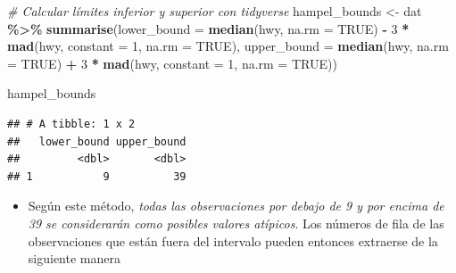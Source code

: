 \documentclass[
]{book}
\newenvironment{Shaded}{\begin{snugshade}}{\end{snugshade}}
\newcommand{\AttributeTok}[1]{\textcolor[rgb]{0.13,0.29,0.53}{#1}}
\newcommand{\CommentTok}[1]{\textcolor[rgb]{0.56,0.35,0.01}{\textit{#1}}}
\newcommand{\ConstantTok}[1]{\textcolor[rgb]{0.56,0.35,0.01}{#1}}
\newcommand{\DecValTok}[1]{\textcolor[rgb]{0.00,0.00,0.81}{#1}}
\newcommand{\FunctionTok}[1]{\textcolor[rgb]{0.13,0.29,0.53}{\textbf{#1}}}
\newcommand{\NormalTok}[1]{#1}
\newcommand{\OtherTok}[1]{\textcolor[rgb]{0.56,0.35,0.01}{#1}}
\newcommand{\SpecialCharTok}[1]{\textcolor[rgb]{0.81,0.36,0.00}{\textbf{#1}}}
\providecommand{\tightlist}{%
  \setlength{\itemsep}{0pt}\setlength{\parskip}{0pt}}
\begin{document}
\begin{Shaded}
\begin{Highlighting}[]
\CommentTok{\# Calcular límites inferior y superior con tidyverse}
\NormalTok{hampel\_bounds }\OtherTok{\textless{}{-}}\NormalTok{ dat }\SpecialCharTok{\%\textgreater{}\%}
  \FunctionTok{summarise}\NormalTok{(}\AttributeTok{lower\_bound =} \FunctionTok{median}\NormalTok{(hwy, }\AttributeTok{na.rm =} \ConstantTok{TRUE}\NormalTok{) }\SpecialCharTok{{-}} \DecValTok{3} \SpecialCharTok{*} \FunctionTok{mad}\NormalTok{(hwy, }\AttributeTok{constant =} \DecValTok{1}\NormalTok{, }\AttributeTok{na.rm =} \ConstantTok{TRUE}\NormalTok{),}
    \AttributeTok{upper\_bound =} \FunctionTok{median}\NormalTok{(hwy, }\AttributeTok{na.rm =} \ConstantTok{TRUE}\NormalTok{) }\SpecialCharTok{+} \DecValTok{3} \SpecialCharTok{*} \FunctionTok{mad}\NormalTok{(hwy, }\AttributeTok{constant =} \DecValTok{1}\NormalTok{, }\AttributeTok{na.rm =} \ConstantTok{TRUE}\NormalTok{))}

\NormalTok{hampel\_bounds}
\end{Highlighting}
\end{Shaded}

\begin{verbatim}
## # A tibble: 1 x 2
##   lower_bound upper_bound
##         <dbl>       <dbl>
## 1           9          39
\end{verbatim}

\begin{itemize}
\tightlist
\item
  Según este método, \emph{todas las observaciones por debajo de 9 y por encima de 39 se considerarán como posibles valores atípicos}. Los números de fila de las observaciones que están fuera del intervalo pueden entonces extraerse de la siguiente manera
\end{itemize}

\begin{Shaded}
\end{Shaded}
\end{document}
